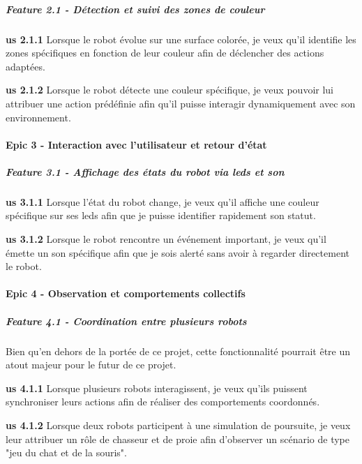 \subparagraph{Feature 2.1 - Détection et suivi des zones de couleur}

\textbf{\acrshort{us} 2.1.1} Lorsque le robot évolue sur une surface colorée, je veux qu’il identifie les zones spécifiques en fonction de leur couleur afin de déclencher des actions adaptées.

\textbf{\acrshort{us} 2.1.2} Lorsque le robot détecte une couleur spécifique, je veux pouvoir lui attribuer une action prédéfinie afin qu’il puisse interagir dynamiquement avec son environnement.

\paragraph{Epic 3 - Interaction avec l’utilisateur et retour d’état}

\subparagraph{Feature 3.1 - Affichage des états du robot via \acrshort{led}s et son}

\textbf{\acrshort{us} 3.1.1} Lorsque l’état du robot change, je veux qu’il affiche une couleur spécifique sur ses \acrshort{led}s afin que je puisse identifier rapidement son statut.

\textbf{\acrshort{us} 3.1.2} Lorsque le robot rencontre un événement important, je veux qu’il émette un son spécifique afin que je sois alerté sans avoir à regarder directement le robot.

\paragraph{Epic 4 - Observation et comportements collectifs}

\subparagraph{Feature 4.1 - Coordination entre plusieurs robots}  
Bien qu'en dehors de la portée de ce projet, cette fonctionnalité pourrait être un atout majeur pour le futur de ce projet.

\textbf{\acrshort{us} 4.1.1} Lorsque plusieurs robots interagissent, je veux qu’ils puissent synchroniser leurs actions afin de réaliser des comportements coordonnés.

\textbf{\acrshort{us} 4.1.2} Lorsque deux robots participent à une simulation de poursuite, je veux leur attribuer un rôle de chasseur et de proie afin d’observer un scénario de type "jeu du chat et de la souris".
